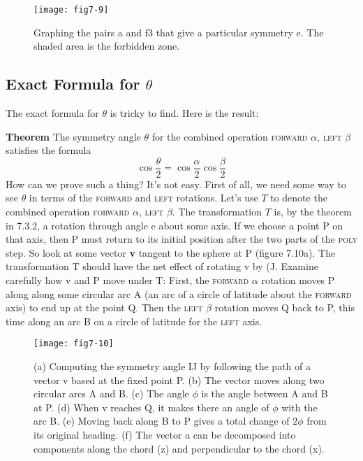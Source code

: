 \documentclass{book}
\begin{document}
\begin{figure}
\begin{center}
\texttt{[image: fig7-9]}
\caption{Graphing the pairs a and f3 that give a particular symmetry e. The shaded area is the forbidden zone.}
\end{center}
\end{figure}

\subsection{Exact Formula for $\theta$}

The exact formula for $\theta$ is tricky to find. Here is the result:

\textbf{Theorem} The symmetry angle $\theta$ for the combined operation \textsc{forward} $\alpha$,
\textsc{left} $\beta$ satisfies the formula
$$\cos \frac{\theta}{2} = \cos \frac{\alpha}{2} \cos \frac{\beta}{2} $$
How can we prove such a thing? It's not easy. First of all, we need some
way to see $\theta$ in terms of the \textsc{forward} and \textsc{left} rotations. Let's use $T$ to
denote the combined operation \textsc{forward} $\alpha$, \textsc{left} $\beta$. The transformation
$T$ is, by the theorem in 7.3.2, a rotation through angle e about some axis.
If we choose a point P on that axis, then P must return to its initial
position after the two parts of the \textsc{poly} step. So look at some vector \textbf{v}
tangent to the sphere at P (figure 7.10a). The transformation T should
have the net effect of rotating v by (J. Examine carefully how v and P
move under T: First, the \textsc{forward} $\alpha$ rotation moves P along along some
circular arc A (an arc of a circle of latitude about the \textsc{forward} axis) to
end up at the point Q. Then the \textsc{left} $\beta$ rotation moves Q back to P,
this time along an arc B on a circle of latitude for the \textsc{left} axis.

\begin{figure}
\begin{center}
\texttt{[image: fig7-10]}
\caption{(a) Computing the symmetry angle IJ by following the path of a vector v based at the fixed point P. (b) The vector moves along two circular arcs A and B. (c) The angle $\phi$ is the angle between A and B at P. (d) When v reaches Q, it makes there an angle of $\phi$ with the arc B. (e) Moving back along B to P gives a total change of $2 \phi$ from its original heading. (f) The vector a can be decomposed into components along the chord (z) and perpendicular to the chord (x).}
\end{center}
\end{figure}
\end{document}
